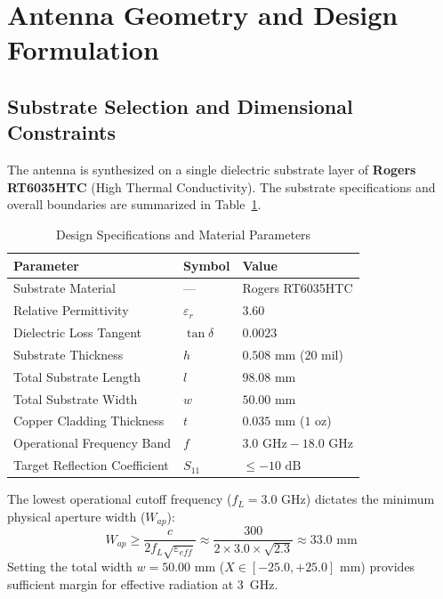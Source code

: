 \documentclass[journal,compsoc,twocolumn,10pt]{IEEEtran}
\begin{document}
\section{Antenna Geometry and Design Formulation}

\subsection{Substrate Selection and Dimensional Constraints}
The antenna is synthesized on a single dielectric substrate layer of \textbf{Rogers RT6035HTC} (High Thermal Conductivity). The substrate specifications and overall boundaries are summarized in Table~\ref{tab:specs}.

\begin{table}[htbp]
\caption{Design Specifications and Material Parameters}
\label{tab:specs}
\centering
\begin{tabular}{@{}lll@{}}
\toprule
\textbf{Parameter} & \textbf{Symbol} & \textbf{Value} \\ \midrule
Substrate Material & --- & Rogers RT6035HTC \\
Relative Permittivity & $\varepsilon_r$ & $3.60$ \\
Dielectric Loss Tangent & $\tan\delta$ & $0.0023$ \\
Substrate Thickness & $h$ & $0.508\text{ mm}$ ($20\text{ mil}$) \\
Total Substrate Length & $l$ & $98.08\text{ mm}$ \\
Total Substrate Width & $w$ & $50.00\text{ mm}$ \\
Copper Cladding Thickness & $t$ & $0.035\text{ mm}$ ($1\text{ oz}$) \\
Operational Frequency Band & $f$ & $3.0\text{ GHz} - 18.0\text{ GHz}$ \\
Target Reflection Coefficient & $S_{11}$ & $\le -10\text{ dB}$ \\ \bottomrule
\end{tabular}
\end{table}

The lowest operational cutoff frequency ($f_L = 3.0\text{ GHz}$) dictates the minimum physical aperture width ($W_{ap}$):
\begin{equation}
W_{ap} \ge \frac{c}{2 f_L \sqrt{\varepsilon_{eff}}} \approx \frac{300}{2 \times 3.0 \times \sqrt{2.3}} \approx 33.0\text{ mm}
\end{equation}
Setting the total width $w = 50.00\text{ mm}$ ($X \in [-25.0, +25.0]\text{ mm}$) provides sufficient margin for effective radiation at 3~GHz.
\end{document}
